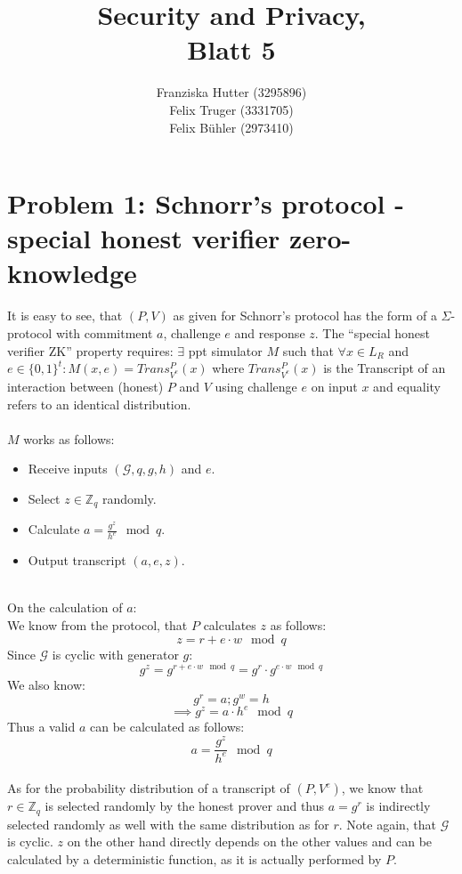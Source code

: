 \documentclass[12pt,pdftex,a4paper]{article}
\title{Security and Privacy,\\ Blatt 5}
\author{Franziska Hutter (3295896)\\
	Felix Truger (3331705)\\
	Felix Bühler (2973410)}
\begin{document}
\maketitle
\pagebreak

\section*{Problem 1: Schnorr’s protocol - special honest verifier zero-knowledge}


It is easy to see, that $(P, V)$ as given for Schnorr’s protocol has the form of a $\Sigma$-protocol with commitment $a$, challenge $e$ and response $z$.
The ``special honest verifier ZK'' property requires: $\exists$ ppt simulator $M$ such that $\forall x\in L_R$ and $e\in \{0,1\}^t: M(x, e) = Trans_{V^e}^P(x)$ where $Trans_{V^e}^P(x)$ is the Transcript of an interaction between (honest) $P$ and $V$ using challenge $e$ on input $x$ and equality refers to an identical distribution.
\\~\\
$M$ works as follows:
\begin{itemize}
\item Receive inputs $(\mathcal{G},q,g,h)$ and $e$.
\item Select $z\in\mathbb{Z}_q$ randomly.
\item Calculate $a = \frac{g^z}{h^e}\mod q$.
\item Output transcript $(a, e, z)$.
\end{itemize}\
\\
On the calculation of $a$:\\
We know from the protocol, that $P$ calculates $z$ as follows:
$$z=r+e\cdot w \mod q$$
Since $\mathcal{G}$ is cyclic with generator $g$:
$$g^z = g^{r+e\cdot w \mod q} = g^r \cdot g^{e\cdot w \mod q}$$
We also know:
$$g^r = a; g^w=h$$
$$\implies g^z = a \cdot h^e \mod q$$
Thus a valid $a$ can be calculated as follows:
$$a = \frac{g^z}{h^e} \mod q$$
\\
As for the probability distribution of a transcript of $(P,V^e)$, we know that $r\in \mathbb{Z}_q$ is selected randomly by the honest prover and thus $a = g^r$ is indirectly selected randomly as well with the same distribution as for $r$. Note again, that $\mathcal{G}$ is cyclic. $z$ on the other hand directly depends on the other values and can be calculated by a deterministic function, as it is actually performed by $P$.\\
\end{document}
